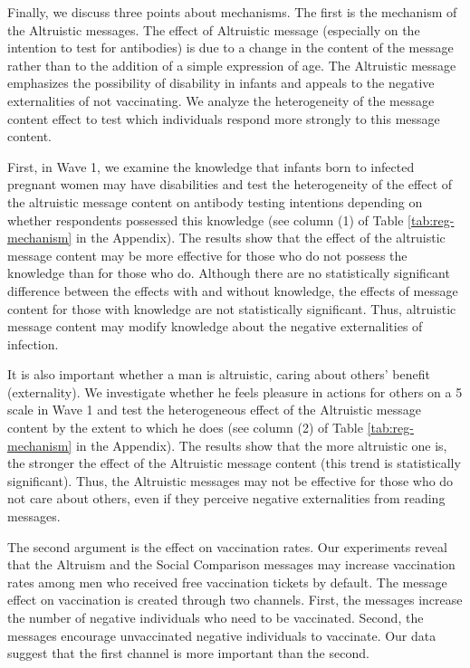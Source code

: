 \documentclass[
]{article}
\begin{document}
Finally, we discuss three points about mechanisms. The first is the mechanism of the Altruistic messages. The effect of Altruistic message (especially on the intention to test for antibodies) is due to a change in the content of the message rather than to the addition of a simple expression of age. The Altruistic message emphasizes the possibility of disability in infants and appeals to the negative externalities of not vaccinating. We analyze the heterogeneity of the message content effect to test which individuals respond more strongly to this message content.

First, in Wave 1, we examine the knowledge that infants born to infected pregnant women may have disabilities and test the heterogeneity of the effect of the altruistic message content on antibody testing intentions depending on whether respondents possessed this knowledge (see column (1) of Table \ref{tab:reg-mechanism} in the Appendix). The results show that the effect of the altruistic message content may be more effective for those who do not possess the knowledge than for those who do. Although there are no statistically significant difference between the effects with and without knowledge, the effects of message content for those with knowledge are not statistically significant. Thus, altruistic message content may modify knowledge about the negative externalities of infection.

It is also important whether a man is altruistic, caring about others' benefit (externality). We investigate whether he feels pleasure in actions for others on a 5 scale in Wave 1 and test the heterogeneous effect of the Altruistic message content by the extent to which he does (see column (2) of Table \ref{tab:reg-mechanism} in the Appendix). The results show that the more altruistic one is, the stronger the effect of the Altruistic message content (this trend is statistically significant). Thus, the Altruistic messages may not be effective for those who do not care about others, even if they perceive negative externalities from reading messages.

The second argument is the effect on vaccination rates. Our experiments reveal that the Altruism and the Social Comparison messages may increase vaccination rates among men who received free vaccination tickets by default. The message effect on vaccination is created through two channels. First, the messages increase the number of negative individuals who need to be vaccinated. Second, the messages encourage unvaccinated negative individuals to vaccinate. Our data suggest that the first channel is more important than the second.
\end{document}
